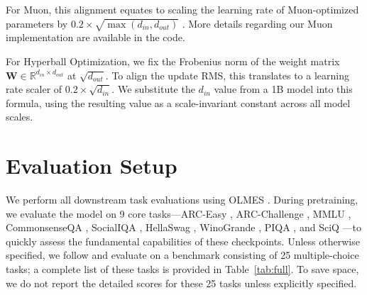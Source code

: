 \documentclass{llmxive}
\providecommand{\bm}[1]{\boldsymbol{#1}}
\providecommand{\mW}{{\bm{W}}}
\begin{document}
For Muon, this alignment equates to scaling the learning rate of Muon-optimized parameters by $0.2 \times \sqrt{\max(d_{in}, d_{out})}$ \cite{k2}. 
More details regarding our Muon implementation are available in the code.

For Hyperball Optimization, we fix the Frobenius norm of the weight matrix $\mW \in \mathbb{R}^{d_{in} \times d_{out}}$ at $\sqrt{d_{out}}$. 
To align the update RMS, this translates to a learning rate scaler of $0.2 \times \sqrt{d_{in}}$. 
We substitute the $d_{in}$ value from a 1B model into this formula, using the resulting value as a scale-invariant constant across all model scales.

\section{Evaluation Setup}
\label{apx:eval}
We perform all downstream task evaluations using OLMES \citep{olmes}. During pretraining, we evaluate the model on 9 core tasks—ARC-Easy \cite{arc}, ARC-Challenge \cite{arc}, MMLU \cite{mmlu}, CommonsenseQA \cite{csqa}, SocialIQA \cite{siqa}, HellaSwag \cite{hella}, WinoGrande \cite{wino}, PIQA \cite{piqa}, and SciQ \cite{sciq}—to quickly assess the fundamental capabilities of these checkpoints. Unless otherwise specified, we follow \cite{olmo3} and evaluate on a benchmark consisting of 25 multiple-choice tasks; a complete list of these tasks is provided in Table~\ref{tab:full}. To save space, we do not report the detailed scores for these 25 tasks unless explicitly specified.

\begin{table}[!htbp]
  \centering
  \small

  \caption{Pretraining hyperparameters (1B AdamW).}
  \label{tab:pthyper_1b}
\end{table}
\end{document}
